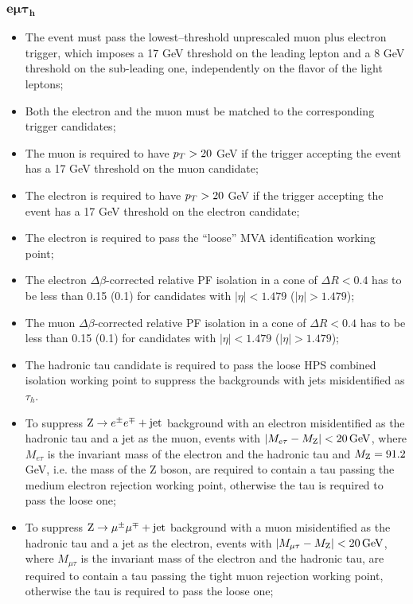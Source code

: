 \subsubsection{$\boldsymbol{e\mu\tau_h}$}
\begin{itemize}
\item The event must pass the lowest--threshold unprescaled muon plus electron trigger, which imposes a 17 GeV threshold on the leading lepton \pT and a 8 GeV threshold on the sub-leading one, independently on the flavor of the light leptons;
\item Both the electron and the muon must be matched to the corresponding trigger candidates;
\item The muon is required to have $p_{T} > 20$ GeV if the trigger accepting the event has a 17 GeV threshold on the muon candidate;
\item The electron is required to have $p_{T} > 20$ GeV if the trigger accepting the event has a 17 GeV threshold on the electron candidate;
\item The electron is required to pass the ``loose'' MVA identification working point;
\item The electron $\Delta \beta$-corrected relative PF isolation in a cone of $\Delta R < 0.4$ has to be less than 0.15 (0.1) for candidates with $|\eta| < 1.479$ ($|\eta| > 1.479$);
\item The muon $\Delta \beta$-corrected relative PF isolation in a cone of $\Delta R < 0.4$ has to be less than 0.15 (0.1) for candidates with $|\eta| < 1.479$ ($|\eta| > 1.479$);
\item The hadronic tau candidate is required to pass the loose HPS combined isolation working point to suppress the backgrounds with jets misidentified as $\tau_h$.
\item To suppress $\mathrm{Z}\rightarrow e^\pm e^\mp+\mathrm{jet}$ background with an electron misidentified as the hadronic tau and a jet as the muon, events with $|M_{e\tau} - M_{\mathrm{Z}}| < 20\, \mathrm{GeV}$, where $M_{e\tau}$ is the invariant mass of the electron and the hadronic tau and $M_{\mathrm{Z}} = 91.2$ GeV, i.e. the mass of the Z boson, are required to contain a tau passing the medium electron rejection working point, otherwise the tau is required to pass the loose one;
\item To suppress $\mathrm{Z}\rightarrow\mu^\pm \mu^\mp+\mathrm{jet}$ background with a muon misidentified as the hadronic tau and a jet as the electron, events with $|M_{\mu\tau} - M_{\mathrm{Z}}| < 20\, \mathrm{GeV}$, where $M_{\mu\tau}$ is the invariant mass of the electron and the hadronic tau, are required to contain a tau passing the tight muon rejection working point, otherwise the tau is required to pass the loose one;
\end{itemize}


